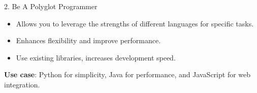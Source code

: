 
\begin{roundedbeamerblock}{2. Be A Polyglot Programmer}
    \baselineskip 50pt
    \vspace{5mm}
    \begin{itemize}
        \item Allows you to leverage the strengths of different languages for specific tasks.
        \item Enhances flexibility and improve performance.
        \item Use existing libraries, increases development speed.
    \vspace{5mm}
        \end{itemize}
    \textbf{Use case}: Python for simplicity, Java for performance, and JavaScript for web integration.

\end{roundedbeamerblock}
